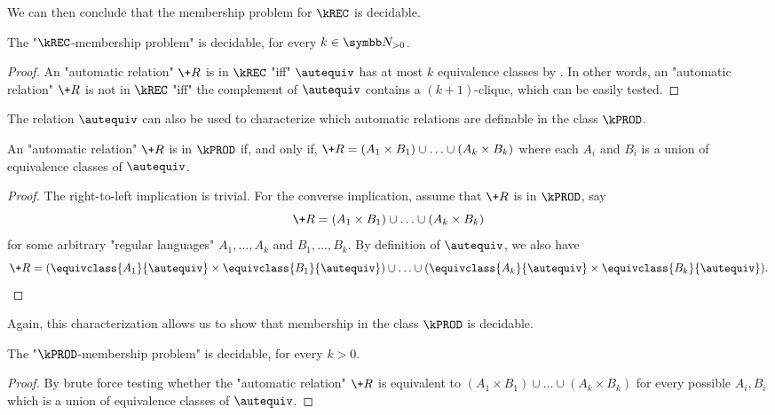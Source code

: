 We can then conclude that the membership problem for $\kREC$ is decidable. 

\begin{corollary}
    The "$\kREC$-membership problem" is decidable, for every $k \in \Np$.
\end{corollary}
\begin{proof}
    An "automatic relation" $\+R$ is in $\kREC$ "iff" $\autequiv$ has at most $k$ equivalence classes by . 
    In other words, an "automatic relation" $\+R$ is not in $\kREC$ "iff" the complement of $\autequiv$ contains a $(k+1)$-clique, which can be easily tested.
\end{proof}

The relation $\autequiv$ can also be used to characterize which automatic relations are definable in the class $\kPROD$.

\begin{proposition}
    An "automatic relation" $\+R$ is in $\kPROD$ if, and only if, $\+R=(A_1 \times B_1) \cup \hdots \cup (A_k \times B_k)$ where each $A_i$ and $B_i$ is a union of equivalence classes of $\autequiv$.
\end{proposition}
\begin{proof}
    The right-to-left implication is trivial. For the converse implication,
    assume that $\+R$ is in $\kPROD$, say
    \[
        \+R=(A_1 \times B_1) \cup \hdots \cup (A_k \times B_k)
    \]
    for some arbitrary "regular languages" $A_1,\hdots,A_k$ and $B_1,\hdots,B_k$.
    By definition of $\autequiv$, we also have
    \[
        \+R=(\equivclass{A_1}{\autequiv} \times \equivclass{B_1}{\autequiv})
        \cup \hdots \cup (\equivclass{A_k}{\autequiv} \times \equivclass{B_k}{\autequiv}).\qedhere
    \]
\end{proof}

Again, this characterization allows us to show that membership in the class $\kPROD$ is decidable. 

\begin{corollary}
    The "$\kPROD$-membership problem" is decidable, for every $k > 0$.
\end{corollary}

\begin{proof}
    By brute force testing whether the "automatic relation" $\+R$ is equivalent to $(A_1 \times B_1) \cup \hdots \cup (A_k \times B_k)$ for every possible $A_i,B_i$ which is a union of equivalence classes of $\autequiv$.
\end{proof}
